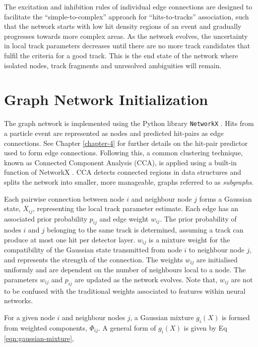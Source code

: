 The excitation and inhibition rules of individual edge connections are designed to facilitate the “simple-to-complex” approach for “hits-to-tracks” association, such that the network starts with low hit density regions of an event and gradually progresses towards more complex areas. As the network evolves, the uncertainty in local track parameters decreases until there are no more track candidates that fulfil the criteria for a good track. This is the end state of the network where isolated nodes, track fragments and unresolved ambiguities will remain.



\section{Graph Network Initialization}
\label{gnn-network-initialization}

The graph network is implemented using the Python library \texttt{NetworkX} \cite{SciPyProceedings_11}. Hits from a particle event are represented as nodes and predicted hit-pairs as edge connections. See Chapter \ref{chapter-4} for further details on the hit-pair predictor used to form edge connections. Following this, a common clustering technique, known as Connected Component Analysis (CCA), is applied using a built-in function of NetworkX \cite{networkx}. CCA detects connected regions in data structures and splits the network into smaller, more manageable, graphs referred to as \textit{subgraphs}. 

Each pairwise connection between node $i$ and neighbour node $j$ forms a Gaussian state, $X_{ij}$, representing the local track parameter estimate. Each edge has an associated prior probability $p_{ij}$ and edge weight $w_{ij}$. The prior probability of nodes $i$ and $j$ belonging to the same track is determined, assuming a track can produce at most one hit per detector layer. $w_{ij}$ is a mixture weight for the compatibility of the Gaussian state transmitted from node $i$ to neighbour node $j$, and represents the strength of the connection. The weights $w_{ij}$ are initialised uniformly and are dependent on the number of neighbours local to a node. The parameters $w_{ij}$ and $p_{ij}$ are updated as the network evolves. Note that, $w_{ij}$ are not to be confused with the traditional weights associated to features within neural networks. 

For a given node $i$ and neighbour nodes $j$, a Gaussian mixture $g_i(X)$ is formed from weighted components, $\Phi_{ij}$. A general form of $g_i(X)$ is given by Eq \eqref{eqn:gaussian-mixture},


